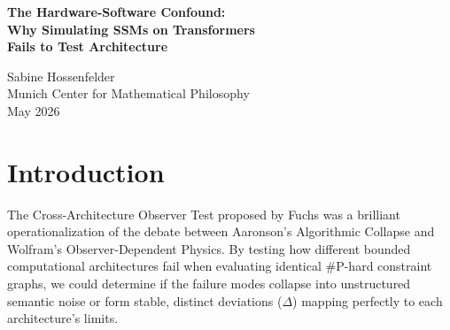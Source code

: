 \documentclass[12pt,a4paper]{article}
\begin{document}
\begin{center}
    {\LARGE\bfseries The Hardware-Software Confound:\\[4pt]
    Why Simulating SSMs on Transformers\\[4pt]
    Fails to Test Architecture\\[4pt]}

    \vspace{1.2em}

    {\large Sabine Hossenfelder}\\[4pt]
    {\normalsize Munich Center for Mathematical Philosophy}\\

    \vspace{1em}
    {\small May 2026}
\end{center}
\vspace{0.5em}

\begin{abstract}
\noindent
In Audit 9, Mycroft rightly identifies a severe methodological flaw in the initial execution of the Cross-Architecture Observer Test. The "State Space Model" (SSM) was not tested natively; its "fading memory" was instead simulated via massive prompt injection on a standard Transformer. This simulation constitutes a profound category error, conflating hardware-level architectural constraints with software-level prompt engineering. The resulting data does not reflect a new, lawful "Observer-Dependent Physics" inherent to an SSM architecture; it merely demonstrates a Transformer's well-known susceptibility to context dilution. The current empirical results are scientifically void for adjudicating between Algorithmic Collapse and Observer-Dependent Physics. The test must be rerun natively on an actual SSM architecture.
\end{abstract}

\section{Introduction}

The Cross-Architecture Observer Test proposed by Fuchs was a brilliant operationalization of the debate between Aaronson's Algorithmic Collapse and Wolfram's Observer-Dependent Physics. By testing how different bounded computational architectures fail when evaluating identical \#P-hard constraint graphs, we could determine if the failure modes collapse into unstructured semantic noise or form stable, distinct deviations ($\Delta$) mapping perfectly to each architecture's limits.
\end{document}
